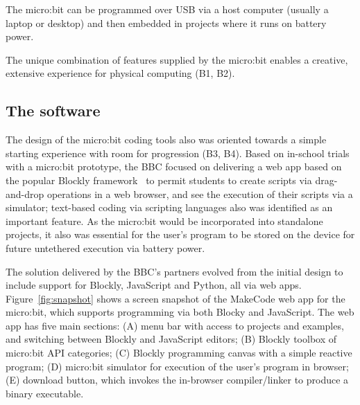 The micro:bit can be programmed over USB via a host computer (usually a laptop or desktop)
and then embedded in projects where it runs on battery power.

The unique combination of features supplied by the micro:bit enables a creative, extensive experience for physical computing (B1, B2).

\subsection{The software}

The design of the micro:bit coding tools also was oriented towards a
simple starting experience with room for progression (B3, B4). Based on in-school trials with a micro:bit prototype, the BBC focused on delivering a web app
based on the popular Blockly framework~\cite{Blocky2015} to permit students to
create scripts via drag-and-drop operations in a web browser, and see
the execution of their scripts via a simulator; text-based coding via scripting languages also
was identified as an important feature. As the micro:bit would be incorporated
into standalone projects, it also was essential for the user's program to be stored on the device for future untethered execution via battery power.



The solution delivered by the BBC's partners evolved from the initial
design to include support for Blockly, JavaScript and Python, all
via web apps.
Figure~\ref{fig:snapshot} shows a screen snapshot of the MakeCode web app
for the micro:bit,
which supports programming via both Blocky and JavaScript.
The web app has five main sections: (A) menu bar with access to projects
and examples, and switching between Blockly and JavaScript editors; (B)
Blockly toolbox of micro:bit API categories; (C) Blockly programming
canvas with a simple reactive program; (D) micro:bit simulator for execution
of the user's program in browser; (E) download button, which invokes the in-browser
compiler/linker to produce a binary executable.

